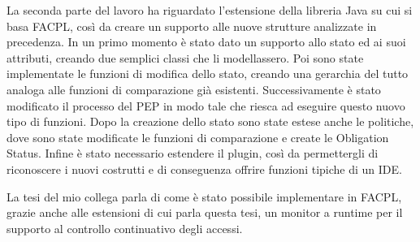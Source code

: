 \documentclass{article}
\begin{document}
La seconda parte del lavoro ha riguardato l'estensione della libreria Java su cui si basa FACPL, così da creare un supporto alle nuove strutture analizzate in precedenza.
In un primo momento è stato dato un supporto allo stato ed ai suoi attributi, creando due semplici classi che li modellassero. Poi sono state implementate le funzioni di modifica dello stato, creando una gerarchia del tutto analoga alle funzioni di comparazione già esistenti. Successivamente è stato modificato il processo del PEP in modo tale che riesca ad eseguire questo nuovo tipo di funzioni.
Dopo la creazione dello stato sono state estese anche le politiche, dove sono state modificate le funzioni di comparazione e create le Obligation Status. Infine è stato necessario estendere il plugin, così da permettergli di riconoscere i nuovi costrutti e di conseguenza offrire funzioni tipiche di un IDE. \par
La tesi del mio collega parla di come è stato possibile implementare in FACPL, grazie anche alle estensioni di cui parla questa tesi, un monitor a runtime per il supporto al controllo continuativo degli accessi.
\end{document}
